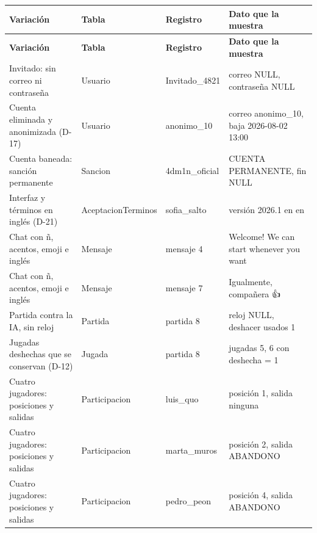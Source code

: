 \begin{center}\footnotesize\setlength{\tabcolsep}{2pt}
\begin{longtable}{|L{130.6pt}|L{86.3pt}|L{94.5pt}|L{142.0pt}|}
\hline
\textbf{\hspace{0pt}Variación} & \textbf{\hspace{0pt}Tabla} & \textbf{\hspace{0pt}Registro} & \textbf{\hspace{0pt}Dato que la muestra} \\ \hline
\endfirsthead
\hline
\textbf{\hspace{0pt}Variación} & \textbf{\hspace{0pt}Tabla} & \textbf{\hspace{0pt}Registro} & \textbf{\hspace{0pt}Dato que la muestra} \\ \hline
\endhead
Invitado: sin correo ni contraseña & Usuario & Invitado\_\allowbreak{}4821 & correo NULL, contraseña NULL \\ \hline
Cuenta eliminada y anonimizada (D-17) & Usuario & anonimo\_\allowbreak{}10 & correo anonimo\_\allowbreak{}10, baja 2026-08-02 13:00 \\ \hline
Cuenta baneada: sanción permanente & Sancion & 4dm1n\_\allowbreak{}oficial & CUENTA PERMANENTE, fin NULL \\ \hline
Interfaz y términos en inglés (D-21) & AceptacionTerminos & sofia\_\allowbreak{}salto & versión 2026.1 en en \\ \hline
Chat con ñ, acentos, emoji e inglés & Mensaje & mensaje 4 & Welcome! We can start whenever you want \\ \hline
Chat con ñ, acentos, emoji e inglés & Mensaje & mensaje 7 & Igualmente, compañera 👍 \\ \hline
Partida contra la IA, sin reloj & Partida & partida 8 & reloj NULL, deshacer usados 1 \\ \hline
Jugadas deshechas que se conservan (D-12) & Jugada & partida 8 & jugadas 5, 6 con deshecha = 1 \\ \hline
Cuatro jugadores: posiciones y salidas & Participacion & luis\_\allowbreak{}quo & posición 1, salida ninguna \\ \hline
Cuatro jugadores: posiciones y salidas & Participacion & marta\_\allowbreak{}muros & posición 2, salida ABANDONO \\ \hline
Cuatro jugadores: posiciones y salidas & Participacion & pedro\_\allowbreak{}peon & posición 4, salida ABANDONO \\ \hline

\end{longtable}
\end{center}
